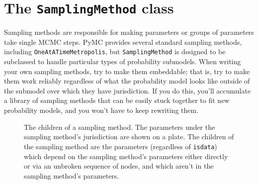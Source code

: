 \documentclass[]{book}
\begin{document}
\section{The \texttt{SamplingMethod} class}\label{sec:SamplingMethod}
Sampling methods are responsible for making parameters or groups of parameters take single MCMC steps. PyMC provides several standard sampling methods, including \texttt{OneAtATimeMetropolis}, but \texttt{SamplingMethod} is designed to be subclassed to handle particular types of probability submodels. When writing your own sampling methods, try to make them embeddable; that is, try to make them work reliably regardless of what the probability model looks like outside of the submodel over which they have jurisdiction. If you do this, you'll accumulate a library of sampling methods that can be easily stuck together to fit new probability models, and you won't have to keep rewriting them.

\begin{figure}[hhhhhhhhh]
    \centering
    \caption{The children of a sampling method. The parameters under the sampling method's jurisdiction are shown on a plate. The children of the sampling method are the parameters (regardless of \texttt{isdata}) which depend on the sampling method's parameters either directly or via an unbroken sequence of nodes, and which aren't in the sampling method's parameters.}
    \label{fig:sampmethod_children}
\end{figure}
\end{document}
